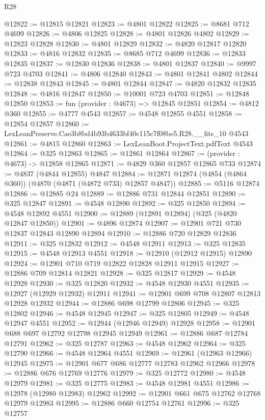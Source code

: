 \begin{lexlean}{R28}
\begin{coremodule}
@12822 := @12815 @12821
@12823 := @4801 @12822
@12825 := @8681 @712 @4699
@12826 := @4806 @12825
@12828 := @4801 @12826 @4802
@12829 := @12823 @12828
@12830 := @4801 @12829
@12832 := @4820 @12817 @12820
@12833 := @4816 @12832
@12835 := @8685 @712 @4699
@12836 := @12833 @12835
@12837 := @12830 @12836
@12838 := @4801 @12837
@12840 := @9997 @723 @4703
@12841 := @4806 @12840
@12843 := @4801 @12841 @4802
@12844 := @12838 @12843
@12845 := @4801 @12844
@12847 := @4820 @12832 @12835
@12848 := @4816 @12847
@12850 := @10001 @723 @4703
@12851 := @12848 @12850
@12853 := fun (provider : @4673) => @12845 @12851
@12854 := @4812 @360
@12855 := @4777 @4543
@12857 := @4548 @12855 @4551
@12858 := @12854 @12857
@12860 := LexLeanPreserve.Cae3b8bd4b93b4633bf40c115c7f08be5.R28.__fits_10 @4543
@12861 := @4815 @12860
@12863 := LexLeanBoot.ProjectText.pdfText @4543
@12864 := @325 @12863
@12865 := @12861 @12864
@12867 := (provider : @4673) -> @12858 @12865
@12871 := @4829 @360 @12857 @12865 @733
@12874 := @4837 (@4844 @12855) @4847
@12884 := @12871 @12874 (@4854 (@4864 @360)) (@4870 (@4871 (@4872 @733) @12857 @4847))
@12885 := @5116 @12874
@12886 := @12885 @24
@12889 := @12886 @731 @12844 @12851
@12890 := @325 @12847
@12891 := @4548 @12890
@12892 := @325 @12850
@12894 := @4548 @12892 @4551
@12900 := @12889 (@12891 @12894) (@325 (@4820 @12847 @12850))
@12901 := @4896 @12874
@12907 := @12901 @721 @730 @12837 @12843 @12890 @12894
@12910 := @12886 @720 @12829 @12836
@12911 := @325 @12832
@12912 := @4548 @12911
@12913 := @325 @12835
@12915 := @4548 @12913 @4551
@12918 := @12910 (@12912 @12915) @12890
@12924 := @12901 @710 @719 @12822 @12828 @12911 @12915
@12927 := @12886 @709 @12814 @12821
@12928 := @325 @12817
@12929 := @4548 @12928
@12930 := @325 @12820
@12932 := @4548 @12930 @4551
@12935 := @12927 (@12929 @12932) @12911
@12941 := @12901 @699 @708 @12807 @12813 @12928 @12932
@12944 := @12886 @698 @12799 @12806
@12945 := @325 @12802
@12946 := @4548 @12945
@12947 := @325 @12805
@12949 := @4548 @12947 @4551
@12952 := @12944 (@12946 @12949) @12928
@12958 := @12901 @688 @697 @12792 @12798 @12945 @12949
@12961 := @12886 @687 @12784 @12791
@12962 := @325 @12787
@12963 := @4548 @12962
@12964 := @325 @12790
@12966 := @4548 @12964 @4551
@12969 := @12961 (@12963 @12966) @12945
@12975 := @12901 @677 @686 @12777 @12783 @12962 @12966
@12978 := @12886 @676 @12769 @12776
@12979 := @325 @12772
@12980 := @4548 @12979
@12981 := @325 @12775
@12983 := @4548 @12981 @4551
@12986 := @12978 (@12980 @12983) @12962
@12992 := @12901 @661 @675 @12762 @12768 @12979 @12983
@12995 := @12886 @660 @12754 @12761
@12996 := @325 @12757

\end{coremodule}
\end{lexlean}
